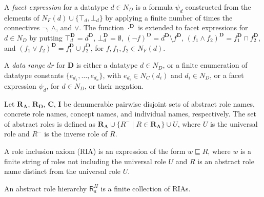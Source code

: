 \documentclass[a4paper]{llncs}
\newcommand{\D}{\mathbf{D}}
\newcommand{\Ra}{\mathbf{R_A}}
\newcommand{\Rd}{\mathbf{R_D}}
\newcommand{\vipcomment}[1]{}
\begin{document}
A \emph{facet expression} for a datatype $d \in N_{D}$ is a formula $\psi_d$ constructed from the elements of $N_{F}(d) \cup \{\top_{d},\bot_{d}\}$ by applying a finite number of times the connectives $\neg$, $\wedge$, and $\vee$. The function  $\cdot^{\D}$ is extended to facet expressions for $d  \in N_{D}$ by putting $\top_{d}^{\D} = d^{\D}$, $\bot_{d}^{\D} = \emptyset$, $(\neg f)^{\D} = d^{\D} \setminus f^{\D}$, $(f_1 \wedge f_2)^{\D} = f_1^{\D} \cap f_2^{\D}$, and $(f_1 \vee f_2)^{\D} = f_1^{\D} \cup f_2^{\D}$, for $f, f_1,f_2 \in N_{F}(d)$.

A \emph{data range} $dr$ for $\D$ is either a datatype $d \in N_{D}$, or a finite enumeration of datatype constants $\{e_{d_1},\ldots,e_{d_n}\}$, with $e_{d_i} \in N_{C}(d_i)$ and $d_i \in N_{D}$, or a facet expression $\psi_d$, for $d \in N_{D}$, or their negation.




Let $\Ra$, $\Rd$, $\mathbf{C}$, $\mathbf{I}$ be denumerable pairwise disjoint sets of abstract role names, concrete role names, concept names, and individual names, respectively.
The set of abstract roles is defined as $\Ra \cup \{ R^- \mid R \in \Ra \} \cup U$, where $U$ is the universal role and $R^-$ is the inverse role of $R$.





A role inclusion axiom (RIA) is an expression of the form $w \sqsubseteq R$, where $w$ is a finite string of roles not including the universal role $U$ and $R$ is an abstract role name distinct from the universal role $U$.


An abstract role hierarchy $\mathsf{R}_{a}^{H}$ is a finite collection of RIAs. \vipcomment{ A strict partial order $\prec$ on  $\Ra \cup \{ R^- \mid R \in \Ra \}$ is called \emph{a regular order} if $\prec$ satisfies, additionally, $S \prec R$ iff $S^- \prec R$, for all roles R and S.\footnote{We recall that a strict partial order $\prec$  on a set $A$ is an irreflexive and transitive relation on $A$.}



 A RIA $w \sqsubseteq R$ is $\prec$-\emph{regular} if $R$ is an abstract role name, and one of the following conditions holds:

\begin{enumerate}
\item{$ w = RR$,}
\item{$w =R^-$,}
\item{$w=S_1...S_n$ and $S_i \prec R$, for all $1 \leq i \leq n$,}
\item{$w=RS_1...S_n$ and $S_i \prec R$, for all $1 \leq i \leq n$,}
\item{$w=S_1...S_nR$ and $S_i \prec R$, for all $1 \leq i \leq n$.}
\end{enumerate}
An abstract role hierarchy $\mathsf{R}_{a}^{H}$ is regular if there exists a regular order $\prec$ such that each RIA in $\mathsf{R}_{a}^{H}$ is $\prec$-regular.
}
\end{document}
